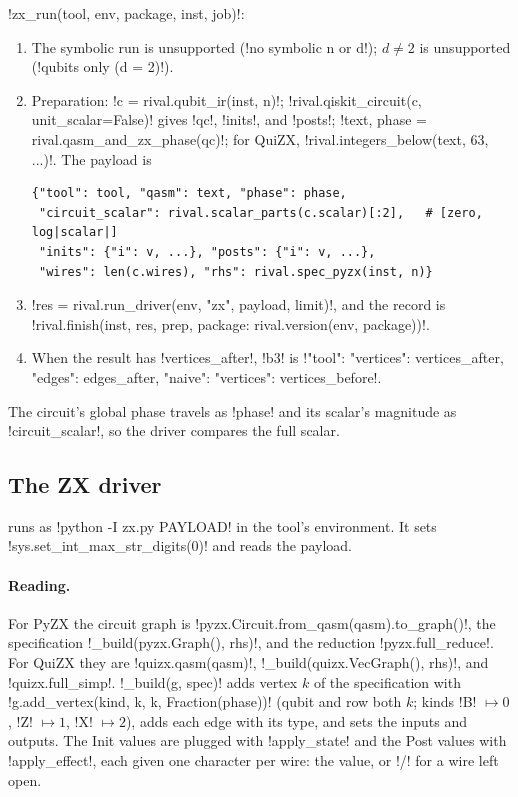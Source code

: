 \begin{algorithm}[ZX run]\label{alg:bench-tools-zx-run}
\py!zx_run(tool, env, package, inst, job)!:
\begin{enumerate}
\item The symbolic run is unsupported (\code!no symbolic n or d!); $d\neq2$ is unsupported (\code!qubits only (d = 2)!).
\item Preparation: \py!c = rival.qubit_ir(inst, n)!; \py!rival.qiskit_circuit(c, unit_scalar=False)! gives \py!qc!, \py!inits!, and \py!posts!; \py!text, phase = rival.qasm_and_zx_phase(qc)!; for QuiZX, \py!rival.integers_below(text, 63, ...)!. The payload is
\begin{lstlisting}[style=python]
{"tool": tool, "qasm": text, "phase": phase,
 "circuit_scalar": rival.scalar_parts(c.scalar)[:2],   # [zero, log|scalar|]
 "inits": {"i": v, ...}, "posts": {"i": v, ...},
 "wires": len(c.wires), "rhs": rival.spec_pyzx(inst, n)}
\end{lstlisting}
\item \py!res = rival.run_driver(env, "zx", payload, limit)!, and the record is \py!rival.finish(inst, res, prep, {package: rival.version(env, package)})!.
\item When the result has \code!vertices_after!, \code!b3! is \py!{"tool": {"vertices": vertices_after, "edges": edges_after}, "naive": {"vertices": vertices_before}}!.
\end{enumerate}
The circuit's global phase travels as \code!phase! and its scalar's magnitude as \code!circuit_scalar!, so the driver compares the full scalar.
\end{algorithm}

\subsection{The ZX driver}\label{sec:bench-tools-zx-driver}

 runs as \code!python -I zx.py PAYLOAD! in the tool's environment. It sets \py!sys.set_int_max_str_digits(0)! and reads the payload.

\paragraph{Reading.} For PyZX the circuit graph is \py!pyzx.Circuit.from_qasm(qasm).to_graph()!, the specification \py!_build(pyzx.Graph(), rhs)!, and the reduction \py!pyzx.full_reduce!. For QuiZX they are \py!quizx.qasm(qasm)!, \py!_build(quizx.VecGraph(), rhs)!, and \py!quizx.full_simp!. \py!_build(g, spec)! adds vertex $k$ of the specification with \py!g.add_vertex(kind, k, k, Fraction(phase))! (qubit and row both $k$; kinds \code!B! $\mapsto0$, \code!Z! $\mapsto1$, \code!X! $\mapsto2$), adds each edge with its type, and sets the inputs and outputs. The Init values are plugged with \py!apply_state! and the Post values with \py!apply_effect!, each given one character per wire: the value, or \code!/! for a wire left open.

